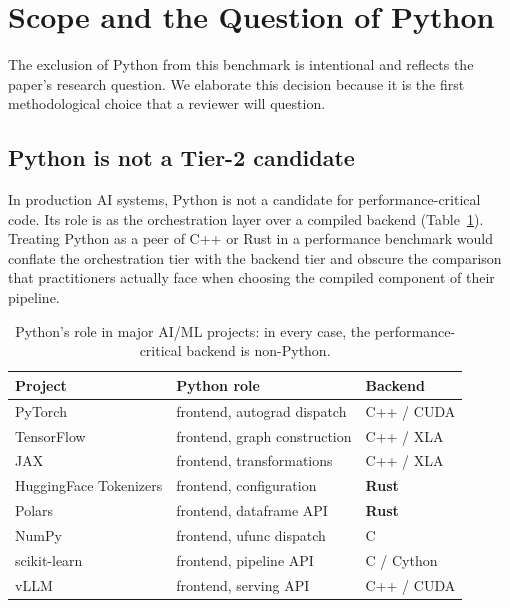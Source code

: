 \documentclass[10pt,conference]{IEEEtran}
\begin{document}
\section{Scope and the Question of Python}
\label{sec:scope}

The exclusion of Python from this benchmark is intentional and
reflects the paper's research question. We elaborate this decision
because it is the first methodological choice that a reviewer will
question.

\subsection{Python is not a Tier-2 candidate}

In production AI systems, Python is not a candidate for
performance-critical code. Its role is as the orchestration layer
over a compiled backend (Table~\ref{tab:python-backends}). Treating
Python as a peer of C++ or Rust in a performance benchmark would
conflate the orchestration tier with the backend tier and obscure
the comparison that practitioners actually face when choosing the
compiled component of their pipeline.

\begin{table}[h]
\caption{Python's role in major AI/ML projects: in every case, the
performance-critical backend is non-Python.}
\label{tab:python-backends}
\centering
\small
\begin{tabular}{lll}
\toprule
\textbf{Project} & \textbf{Python role} & \textbf{Backend} \\
\midrule
PyTorch                & frontend, autograd dispatch & C++ / CUDA \\
TensorFlow             & frontend, graph construction & C++ / XLA \\
JAX                    & frontend, transformations    & C++ / XLA \\
HuggingFace Tokenizers & frontend, configuration      & \textbf{Rust} \\
Polars                 & frontend, dataframe API      & \textbf{Rust} \\
NumPy                  & frontend, ufunc dispatch     & C \\
scikit-learn           & frontend, pipeline API       & C / Cython \\
vLLM                   & frontend, serving API        & C++ / CUDA \\
\bottomrule
\end{tabular}
\end{table}
\end{document}
